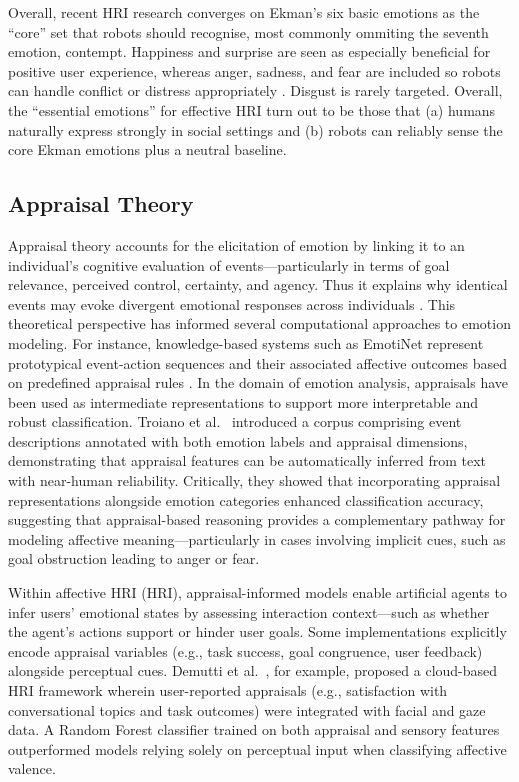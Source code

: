 Overall, recent HRI research converges on Ekman's six basic emotions as the ``core'' set that robots should recognise, most commonly ommiting the seventh emotion, contempt. Happiness and surprise are seen as especially beneficial for positive user experience, whereas anger, sadness, and fear are included so robots can handle conflict or distress appropriately \cite{Chuah2021-zw}. Disgust is rarely targeted. Overall, the ``essential emotions'' for effective HRI turn out to be those that (a) humans naturally express strongly in social settings and (b) robots can reliably sense the core Ekman emotions plus a neutral baseline.

\subsection{Appraisal Theory}

Appraisal theory accounts for the elicitation of emotion by linking it to an individual's cognitive evaluation of events—particularly in terms of goal relevance, perceived control, certainty, and agency. Thus it explains why identical events may evoke divergent emotional responses across individuals \cite{Suhaila_2021-ez}. This theoretical perspective has informed several computational approaches to emotion modeling. For instance, knowledge-based systems such as EmotiNet represent prototypical event-action sequences and their associated affective outcomes based on predefined appraisal rules \cite{Balahur2011-mb}. In the domain of emotion analysis, appraisals have been used as intermediate representations to support more interpretable and robust classification. Troiano et al.\ \cite{Troiano2023-if} introduced a corpus comprising event descriptions annotated with both emotion labels and appraisal dimensions, demonstrating that appraisal features can be automatically inferred from text with near-human reliability. Critically, they showed that incorporating appraisal representations alongside emotion categories enhanced classification accuracy, suggesting that appraisal-based reasoning provides a complementary pathway for modeling affective meaning—particularly in cases involving implicit cues, such as goal obstruction leading to anger or fear.

Within affective HRI (HRI), appraisal-informed models enable artificial agents to infer users' emotional states by assessing interaction context—such as whether the agent's actions support or hinder user goals. Some implementations explicitly encode appraisal variables (e.g., task success, goal congruence, user feedback) alongside perceptual cues. Demutti et al.\ \cite{Demutti2022-vz}, for example, proposed a cloud-based HRI framework wherein user-reported appraisals (e.g., satisfaction with conversational topics and task outcomes) were integrated with facial and gaze data. A Random Forest classifier trained on both appraisal and sensory features outperformed models relying solely on perceptual input when classifying affective valence.

